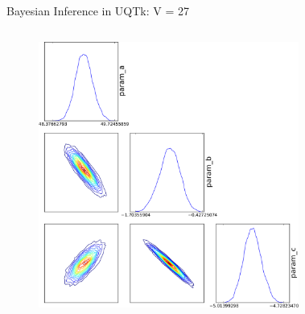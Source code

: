 \documentclass[10pt]{beamer}
\begin{document}
\begin{frame}{Bayesian Inference in UQTk: V = 27}
	\begin{columns}[c]		
			\begin{figure}
	 	 		\includegraphics[width=\textwidth]{V27_posteriors}
	 		\end{figure}
	 		\begin{figure}[ht]
	 			\newline
	 			\newline

\end{figure}
\end{columns}
\end{frame}
\end{document}
